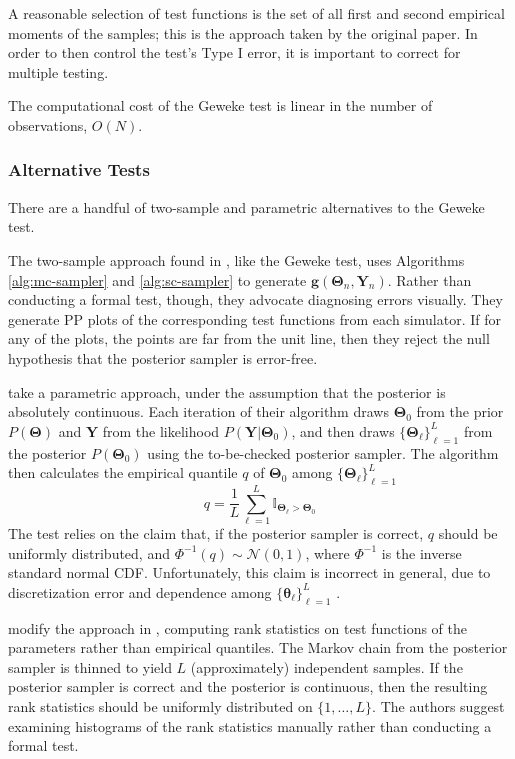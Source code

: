 \documentclass[a4paper,11pt]{article}
\begin{document}
A reasonable selection of test functions is the set of all first and second empirical moments of the samples; this is the approach taken by the original paper. In order to then control the test's Type I error, it is important to correct for multiple testing. 

The computational cost of the Geweke test is linear in the number of observations, $O(N)$.

\subsubsection{Alternative Tests}
There are a handful of two-sample and parametric alternatives to the Geweke test.

The two-sample approach found in \cite{grosse_testing_2014}, like the Geweke test, uses Algorithms \ref{alg:mc-sampler} and \ref{alg:sc-sampler} to generate $\mathbf{g}(\mathbf{\Theta}_{n}, \mathbf{Y}_{n})$. Rather than conducting a formal test, though, they advocate diagnosing errors visually. They generate PP plots of the corresponding test functions from each simulator. If for any of the plots, the points are far from the unit line, then they reject the null hypothesis that the posterior sampler is error-free.

\cite{cook_validation_2006} take a parametric approach, under the assumption that the posterior is absolutely continuous. Each iteration of their algorithm draws $\mathbf{\Theta}_{0}$ from the prior $P(\mathbf{\Theta})$ and $\mathbf{Y}$ from the likelihood $P(\mathbf{Y}|\mathbf{\Theta}_{0})$, and then draws $\{\mathbf{\Theta}_{\ell}\}_{\ell=1}^{L}$ from the posterior $P(\mathbf{\Theta}_{0})$ using the to-be-checked posterior sampler. The algorithm then calculates the empirical quantile $q$ of $\mathbf{\Theta}_{0}$ among $\{\mathbf{\Theta}_{\ell}\}_{\ell=1}^{L}$
$$
q = \frac{1}{L} \sum_{\ell=1}^{L} \mathbb{I}_{\mathbf{\Theta}_{\ell} > \mathbf{\Theta}_{0}}
$$
The test relies on the claim that, if the posterior sampler is correct, $q$ should be uniformly distributed, and $\Phi^{-1}(q) \sim \mathcal{N}(0,1)$, where $\Phi^{-1}$ is the inverse standard normal CDF. Unfortunately, this claim is incorrect in general, due to discretization error and dependence among $\{\mathbf{\theta}_{\ell}\}_{\ell=1}^{L}$ \cite{gelman_correction_2017}.

\cite{talts_validating_2018} modify the approach in \cite{cook_validation_2006}, computing rank statistics on test functions of the parameters rather than empirical quantiles. The Markov chain from the posterior sampler is thinned to yield $L$ (approximately) independent samples. If the posterior sampler is correct and the posterior is continuous, then the resulting rank statistics should be uniformly distributed on $\{1, \ldots, L\}$. The authors suggest examining histograms of the rank statistics manually rather than conducting a formal test.
\end{document}

